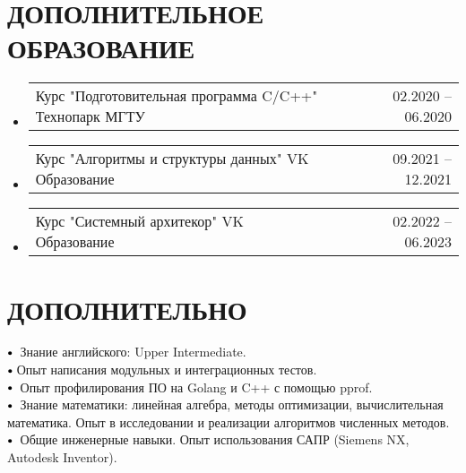 \documentclass[letterpaper,11pt]{article}
\makeatletter
\newcommand{\resumeSubheadingAdditional}[2]{
	\vspace{-2pt}\item
	\begin{tabular*}{1.0\textwidth}[t]{l@{\extracolsep{\fill}}r}
		\large#1 & \small #2 \\
		
	\end{tabular*}\vspace{-7pt}
}
\newcommand{\resumeSubHeadingListStart}{\begin{itemize}[leftmargin=0.0in, label={}]}
\newcommand{\resumeSubHeadingListEnd}{\end{itemize}}
\newcommand\sbullet[1][.5]{\mathbin{\vcenter{\hbox{\scalebox{#1}{$\bullet$}}}}}
\makeatother
\begin{document}
 \section{ДОПОЛНИТЕЛЬНОЕ ОБРАЗОВАНИЕ}
 \resumeSubHeadingListStart
 \resumeSubheadingAdditional
 {Курс "Подготовительная программа C/C++" Технопарк МГТУ}{02.2020 -- 06.2020}
 \resumeSubHeadingListEnd
 
 \resumeSubHeadingListStart
 \resumeSubheadingAdditional
 {Курс "Алгоритмы и структуры данных" VK Образование}{09.2021 -- 12.2021}
 \resumeSubHeadingListEnd
 
 \resumeSubHeadingListStart
 \resumeSubheadingAdditional
 {Курс "Системный архитекор" VK Образование}{02.2022 -- 06.2023}
 \resumeSubHeadingListEnd

\section{ДОПОЛНИТЕЛЬНО}

$\sbullet[.75] \hspace{0.2cm}${{Знание английского: Upper Intermediate.}} \\
$\sbullet[.75] \hspace{0.1cm}${{Опыт написания модульных и интеграционных тестов.}} \hspace{1.6cm} \\
$\sbullet[.75] \hspace{0.2cm}${{Опыт профилирования ПО на Golang и C++ с помощью pprof.}} \\
$\sbullet[.75] \hspace{0.2cm}${{Знание математики: линейная алгебра, методы оптимизации, вычислительная математика. Опыт в исследовании и реализации алгоритмов численных методов.}} \\
$\sbullet[.75] \hspace{0.2cm}${{Общие инженерные навыки. Опыт использования САПР (Siemens NX, Autodesk Inventor).}} \\


\end{document}
